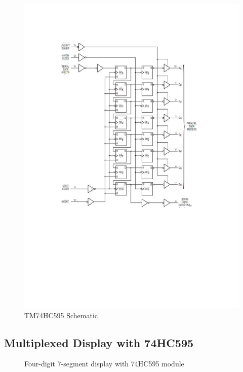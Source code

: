 \documentclass[13pt,a4paper,twoside]{report}
\begin{document}
\begin{figure}[H]
\centering
\includegraphics[scale=0.8]{images/tm74hc595_schem.pdf}
\caption{TM74HC595 Schematic\protect\footnotemark}
\end{figure}


\subsection{Multiplexed Display with 74HC595}
\begin{figure}[H]
\centering
{}\qquad\qquad
{}
\caption{Four-digit 7-segment display with 74HC595 module}
\end{figure}
\end{document}
